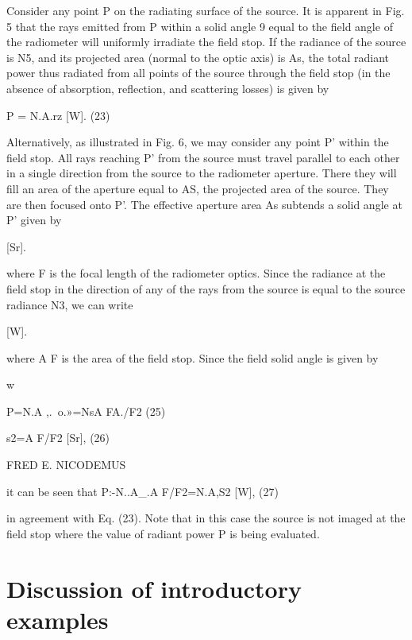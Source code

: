 \begin{refsection}
Consider any point P on the radiating surface
of the source. It is apparent in Fig. 5 that the
rays emitted from P within a solid angle 9 equal
to the field angle of the radiometer will uniformly
irradiate the field stop. If the radiance of the
source is N5, and its projected area (normal to
the optic axis) is As, the total radiant power thus
radiated from all points of the source through the
field stop (in the absence of absorption, reflection,
and scattering losses) is given by

P = N.A.rz [W]. (23)

Alternatively, as illustrated in Fig. 6, we may
consider any point P’ within the field stop. All
rays reaching P’ from the source must travel
parallel to each other in a single direction from
the source to the radiometer aperture. There they
will fill an area of the aperture equal to AS, the
projected area of the source. They are then
focused onto P’. The effective aperture area As
subtends a solid angle at P’ given by

[Sr].

where F is the focal length of the radiometer
optics. Since the radiance at the field stop in the
direction of any of the rays from the source is
equal to the source radiance N3, we can write

[W].

where A F is the area of the field stop. Since the
field solid angle is given by

w%

P=N.A ,.~o.»=NsA FA./F2 (25)

s2=A F/F2 [Sr], (26)

FRED E. NICODEMUS

it can be seen that
P:-N..A_.A F/F2=N.A,S2 [W], (27)

in agreement with Eq. (23). Note that in this
case the source is not imaged at the field stop
where the value of radiant power P is being
evaluated.
\fi

\section{Discussion of introductory examples}


\end{refsection}
